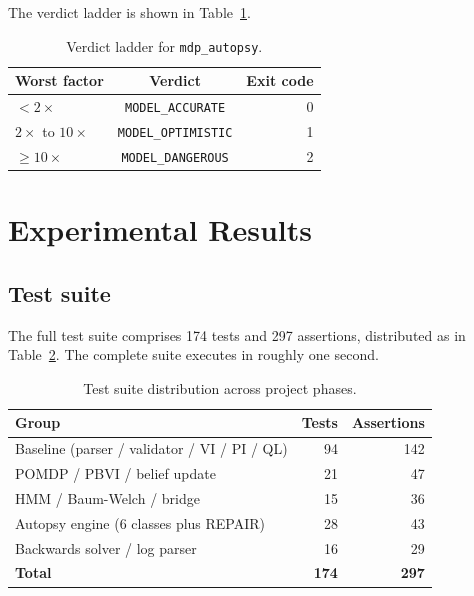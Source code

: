 \documentclass[conference]{IEEEtran}
\begin{document}
The verdict ladder is shown in Table~\ref{tab:verdict}.

\begin{table}[h]
\caption{Verdict ladder for \texttt{mdp\_autopsy}.}
\label{tab:verdict}
\centering
\begin{tabular}{lcr}
\hline
\textbf{Worst factor} & \textbf{Verdict} & \textbf{Exit code} \\
\hline
$< 2 \times$            & \texttt{MODEL\_ACCURATE}   & 0 \\
$2 \times$ to $10 \times$ & \texttt{MODEL\_OPTIMISTIC} & 1 \\
$\ge 10 \times$           & \texttt{MODEL\_DANGEROUS}  & 2 \\
\hline
\end{tabular}
\end{table}

\section{Experimental Results}\label{sec:experiments}

\subsection{Test suite}

The full test suite comprises 174 tests and 297 assertions,
distributed as in Table~\ref{tab:tests}. The complete suite executes
in roughly one second.

\begin{table}[h]
\caption{Test suite distribution across project phases.}
\label{tab:tests}
\centering
\begin{tabular}{lrr}
\hline
\textbf{Group} & \textbf{Tests} & \textbf{Assertions} \\
\hline
Baseline (parser / validator / VI / PI / QL) & 94 & 142 \\
POMDP / PBVI / belief update                  & 21 & 47 \\
HMM / Baum-Welch / bridge                     & 15 & 36 \\
Autopsy engine (6 classes plus REPAIR)        & 28 & 43 \\
Backwards solver / log parser                 & 16 & 29 \\
\hline
\textbf{Total}                                & \textbf{174} & \textbf{297} \\
\hline
\end{tabular}
\end{table}
\end{document}
